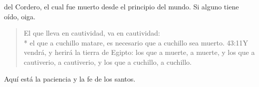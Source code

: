  del Cordero, el cual fue muerto desde el principio del mundo.
Si alguno tiene oído, oiga. 
\begin{verse}
El que lleva en cautividad, va en cautividad:\\* el que a cuchillo matare, es necesario que a cuchillo sea muerto.%
					{43:11}{Y vendrá, y herirá la tierra de Egipto: los que a muerte, a muerte, y los que a cautiverio, a cautiverio, y los que a cuchillo, a cuchillo.}%
\end{verse}

\noindent
Aquí está la paciencia y la fe de los santos.
